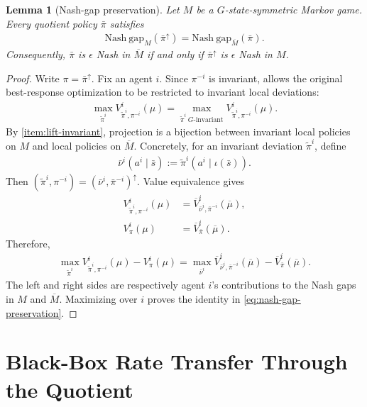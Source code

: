 \documentclass{article}
\theoremstyle{plain}
\newtheorem{lemma}[theorem]{Lemma}
\theoremstyle{definition}
\theoremstyle{remark}
\newcommand{\Nash}{\mathrm{Nash\ gap}}
\newcommand{\quotient}[1]{\overline{#1}}
\newcommand{\Vbar}{\overline{V}}
\begin{document}
\begin{lemma}[Nash-gap preservation]
\label{lemma:nash-gap-preservation}
Let $M$ be a $G$-state-symmetric Markov game. Every quotient policy $\bar\pi$
satisfies
\begin{align*}
  \Nash_M(\bar\pi^\uparrow)
  =
  \Nash_{\quotient M}(\bar\pi).
\end{align*}
Consequently, $\bar\pi$ is $\epsilon$ Nash in $\quotient M$ if and only if
$\bar\pi^\uparrow$ is $\epsilon$ Nash in $M$.
\end{lemma}

\begin{proof}
Write $\pi=\bar\pi^\uparrow$. Fix an agent $i$. Since $\pi^{-i}$ is invariant,
 allows the original best-response optimization to
be restricted to invariant local deviations:
\begin{align*}
  \max_{\widetilde\pi^i}
  V^i_{\widetilde\pi^i,\pi^{-i}}(\mu)
  =
  \max_{\widetilde\pi^i\ G\text{-invariant}}
  V^i_{\widetilde\pi^i,\pi^{-i}}(\mu).
\end{align*}
By \ref{item:lift-invariant}, projection is a
bijection between invariant local policies on $M$ and local policies on
$\quotient M$. Concretely, for an invariant deviation $\widetilde\pi^i$, define
\begin{align*}
  \bar\nu^i(a^i\mid\bar s)
  :=
  \widetilde\pi^i(a^i\mid\iota(\bar s)).
\end{align*}
Then
$(\widetilde\pi^i,\pi^{-i})
=
(\bar\nu^i,\bar\pi^{-i})^\uparrow$.
Value equivalence gives
\begin{align*}
  V^i_{\widetilde\pi^i,\pi^{-i}}(\mu)
  &=
  \Vbar^i_{\bar\nu^i,\bar\pi^{-i}}(\quotient\mu),\\
  V^i_\pi(\mu)
  &=
  \Vbar^i_{\bar\pi}(\quotient\mu).
\end{align*}
Therefore,
\begin{align*}
  \max_{\widetilde\pi^i}
  V^i_{\widetilde\pi^i,\pi^{-i}}(\mu)
  -
  V^i_\pi(\mu)
  =
  \max_{\bar\nu^i}
  \Vbar^i_{\bar\nu^i,\bar\pi^{-i}}(\quotient\mu)
  -
  \Vbar^i_{\bar\pi}(\quotient\mu).
\end{align*}
The left and right sides are respectively agent $i$'s contributions to the Nash
gaps in $M$ and $\quotient M$. Maximizing over $i$ proves
the identity in \eqref{eq:nash-gap-preservation}.
\end{proof}

\section{Black-Box Rate Transfer Through the Quotient}
\label{app:proof-quotient-rate-transfer}
\end{document}
